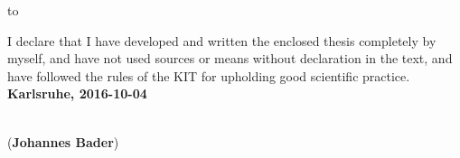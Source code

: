 
\vspace*{33\baselineskip}
\hbox to \textwidth{\hrulefill}
\par
I declare that I have developed and written the enclosed thesis completely by myself, and have not used sources or means without declaration  in the text, and have followed the rules of the KIT for upholding good scientific practice.\\

\textbf{Karlsruhe, 2016-10-04}
\vspace{1.5cm}
 
\dotfill\hspace*{8.0cm}\\
\hspace*{2cm}(\textbf{Johannes Bader}) %

